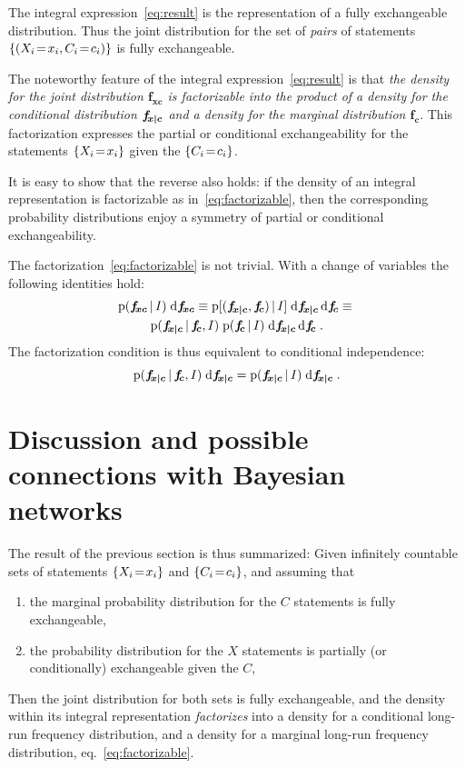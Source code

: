 \documentclass[\ifafour a4paper,12pt,\else a5paper,10pt,\fi%
onecolumn,oneside,article,%
british%
]{memoir}
\theoremstyle{remark}
\theoremstyle{innote}
\newcommand*{\di}{\mathrm{d}}%
\DeclarePairedDelimiter\set{\{}{\}}
\newcommand*{\pf}{\mathrm{p}}%
\renewcommand*{\|}[1][]{\nonscript\,#1\vert\nonscript\,\mathopen{}}
\newcommand*{\eqn}{eq.}%
\renewcommand*{\=}{\TextOrMath\texteq\eq}
\newcommand*{\X}[1]{X_{#1}}
\newcommand*{\x}[1]{x_{#1}}
\newcommand*{\C}[1]{C_{#1}}
\newcommand*{\cc}[1]{c_{#1}}
\newcommand*{\fxc}{\bm{f_{\!x\bcond c}}}
\newcommand*{\fc}{\bm{f_{\!c}}}
\newcommand*{\fj}{\bm{f_{\!xc}}}
\newcommand*{\bcond}[1][]{\nonscript\,#1\bm{\vert}\nonscript\;\mathopen{}}
\begin{document}
The integral expression~\eqref{eq:result} is the representation of a fully
exchangeable distribution. Thus the joint distribution for the set of
\emph{pairs} of statements $\set{(\X{i}\=\x{i}, \C{i}\=\cc{i})}$ is
fully exchangeable.

The noteworthy feature of the integral expression~\eqref{eq:result} is that
\emph{the density for the joint distribution $\fj$ is factorizable into the
  product of a density for the conditional distribution $\fxc$ and a
  density for the marginal distribution $\fc$}. This factorization
expresses the partial or conditional exchangeability for the statements
$\set{\X{i}\=\x{i}}$ given the $\set{\C{i}\=\cc{i}}$.

It is easy to show that the reverse also holds: if the density of an
integral representation is factorizable as in~\eqref{eq:factorizable}, then
the corresponding probability distributions enjoy a symmetry of partial or
conditional exchangeability.

The factorization~\eqref{eq:factorizable} is not trivial. With a change of
variables the following identities hold:
\begin{multline}
  \label{eq:identities_factor}
  \pf(\fj\|I)\;\di\fj \equiv
  \pf[(\fxc,\fc) \| I] \;\di\fxc\,\di\fc
  \equiv{}\\
  \pf(\fxc \| \fc, I)  \;
  \pf(\fc \| I) \;\di\fxc\,\di\fc \;.
\end{multline}
The factorization condition is thus equivalent to conditional independence:
\begin{equation}
  \label{eq:cond_indep_ff}
  \pf(\fxc \| \fc, I) \;\di\fxc =
\pf(\fxc \| I) \;\di\fxc \;.
\end{equation}


\section{Discussion and possible connections with Bayesian networks}
\label{sec:discuss}

The result of the previous section is thus summarized: Given infinitely
countable sets of statements $\set{\X{i}\=\x{i}}$ and
$\set{\C{i}\=\cc{i}}$, and assuming that
\begin{enumerate}[wide]
\item the marginal probability distribution for the $C$ statements is fully
  exchangeable,
\item the probability distribution for the $X$ statements is partially (or
  conditionally) exchangeable given the $C$,
\end{enumerate}
Then the joint distribution for both sets is fully exchangeable, and the
density within its integral representation \emph{factorizes} into a density
for a conditional long-run frequency distribution, and a density for a
marginal long-run frequency distribution, \eqn~\eqref{eq:factorizable}.
\end{document}
